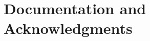 \documentclass{report}
\begin{document}
\chapter{Documentation and Acknowledgments}\label{ch:documentation}
\end{document}
